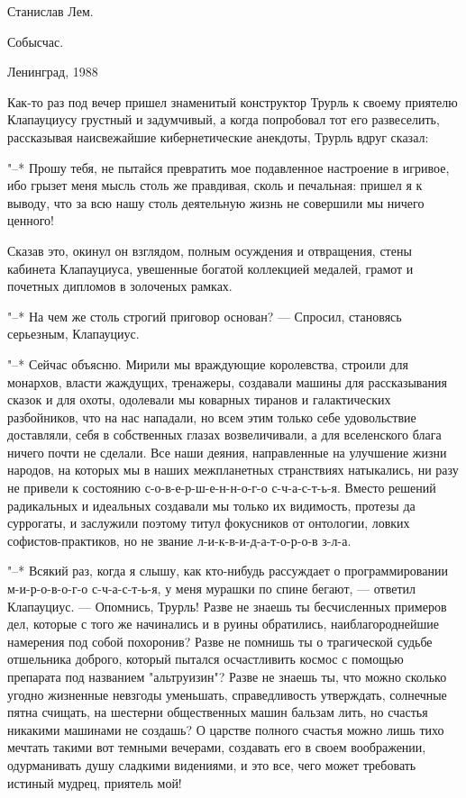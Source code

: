 
Станислав Лем.

Собысчас.


Ленинград, 1988

Как-то раз под вечер пришел знаменитый конструктор Трурль
к своему приятелю Клапауциусу грустный и задумчивый, а когда
попробовал тот его развеселить, рассказывая наисвежайшие
кибернетические анекдоты, Трурль вдруг сказал:

"--* Прошу тебя, не пытайся превратить мое подавленное
настроение в игривое, ибо грызет меня мысль столь же
правдивая, сколь и печальная: пришел я к выводу, что за всю
нашу столь деятельную жизнь не совершили мы ничего ценного!

Сказав это, окинул он взглядом, полным осуждения и
отвращения, стены кабинета Клапауциуса, увешенные богатой
коллекцией медалей, грамот и почетных дипломов в золоченых
рамках.

"--* На чем же столь строгий приговор основан? --- Спросил,
становясь серьезным, Клапауциус.

"--* Сейчас объясню. Мирили мы враждующие королевства,
строили для монархов, власти жаждущих, тренажеры, создавали
машины для рассказывания сказок и для охоты, одолевали мы
коварных тиранов и галактических разбойников, что на нас
нападали, но всем этим только себе удовольствие доставляли,
себя в собственных глазах возвеличивали, а для вселенского
блага ничего почти не сделали. Все наши деяния, направленные
на улучшение жизни народов, на которых мы в наших
межпланетных странствиях натыкались, ни разу не привели к
состоянию с-о-в-е-р-ш-е-н-н-о-г-о с-ч-а-с-т-ь-я. Вместо
решений радикальных и идеальных создавали мы только их
видимость, протезы да суррогаты, и заслужили поэтому титул
фокусников от онтологии, ловких софистов-практиков, но не
звание л-и-к-в-и-д-а-т-о-р-о-в з-л-а.

"--* Всякий раз, когда я слышу, как кто-нибудь рассуждает о
программировании м-и-р-о-в-о-г-о с-ч-а-с-т-ь-я, у меня
мурашки по спине бегают, --- ответил Клапауциус. --- Опомнись,
Трурль! Разве не знаешь ты бесчисленных примеров дел,
которые с того же начинались и в руины обратились,
наиблагороднейшие намерения под собой похоронив? Разве не
помнишь ты о трагической судьбе отшельника доброго, который
пытался осчастливить космос с помощью препарата под
названием "альтруизин"? Разве не знаешь ты, что можно
сколько угодно жизненные невзгоды уменьшать, справедливость
утверждать, солнечные пятна счищать, на шестерни
общественных машин бальзам лить, но счастья никакими
машинами не создашь? О царстве полного счастья можно лишь
тихо мечтать такими вот темными вечерами, создавать его в
своем воображении, одурманивать душу сладкими видениями, и
это все, чего может требовать истиный мудрец, приятель мой!

